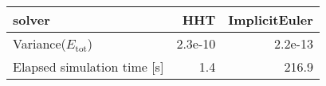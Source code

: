 \begin{tabular}{lrr}
\hline
 solver                      &     HHT &   ImplicitEuler \\
\hline
 Variance($E_{\text{tot}}$)  & 2.3e-10 &         2.2e-13 \\
 Elapsed simulation time [s] & 1.4     &       216.9     \\
\hline
\end{tabular}